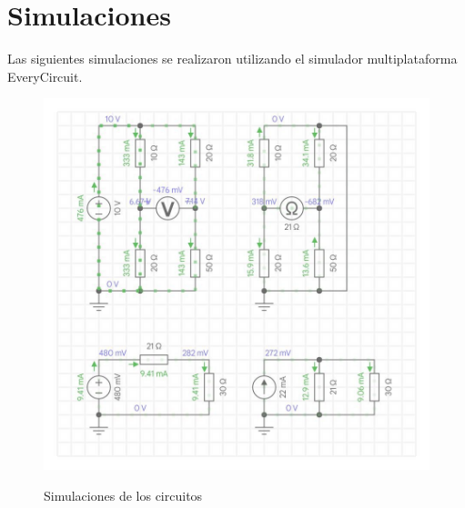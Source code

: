\documentclass[a4paper,12pt]{article}
\begin{document}
\newpage


\section*{Simulaciones}

Las siguientes simulaciones se realizaron utilizando el simulador multiplataforma EveryCircuit\texttrademark.\par



\vspace{.5cm}

\begin{figure}[!h]
\centering
	\includegraphics[width=.8\textwidth]{fig1}
	\label{fig1}
	 \caption{Simulaciones de los circuitos}
\end{figure}
\end{document}
